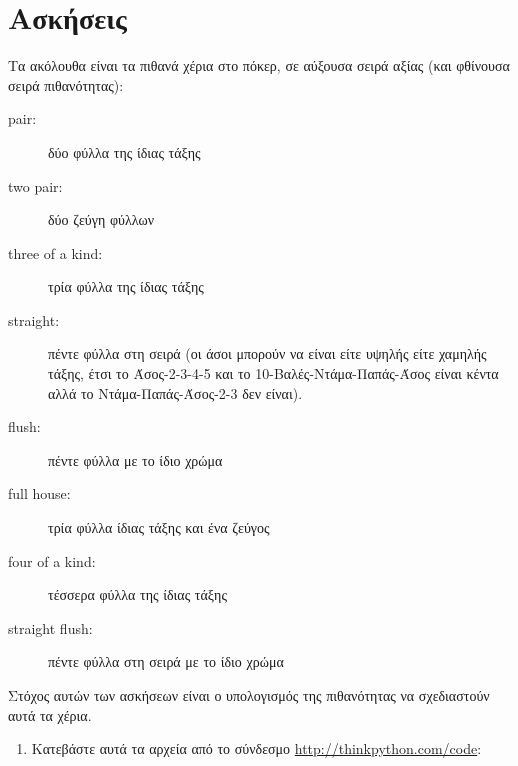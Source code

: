 \documentclass[10pt]{book}
\begin{document}
\section{Ασκήσεις}

\begin{exercise}
\label{poker}

Τα ακόλουθα είναι τα πιθανά χέρια στο πόκερ, σε αύξουσα σειρά αξίας (και φθίνουσα 
σειρά πιθανότητας):

\begin{description}

\item[pair:]  δύο φύλλα της ίδιας τάξης 
\vspace{-0.05in}

\item[two pair:]  δύο ζεύγη φύλλων 
\vspace{-0.05in}

\item[three of a kind:]  τρία φύλλα της ίδιας τάξης 
\vspace{-0.05in}

\item[straight:]  πέντε φύλλα στη σειρά (οι άσοι μπορούν να είναι είτε υψηλής είτε χαμηλής τάξης, έτσι το Άσος-2-3-4-5 και το 10-Βαλές-Ντάμα-Παπάς-Άσος είναι κέντα αλλά το Ντάμα-Παπάς-Άσος-2-3 δεν είναι). 
\vspace{-0.05in}

\item[flush:]  πέντε φύλλα με το ίδιο χρώμα 
\vspace{-0.05in}

\item[full house:]  τρία φύλλα ίδιας τάξης και ένα ζεύγος 
\vspace{-0.05in}

\item[four of a kind:]  τέσσερα φύλλα της ίδιας τάξης 
\vspace{-0.05in}

\item[straight flush:]  πέντε φύλλα στη σειρά με το ίδιο χρώμα 
\vspace{-0.05in}

\end{description}
%
Στόχος αυτών των ασκήσεων είναι ο υπολογισμός της πιθανότητας να σχεδιαστούν 
αυτά τα χέρια.

\begin{enumerate}

\item Κατεβάστε αυτά τα αρχεία από το σύνδεσμο \url{http://thinkpython.com/code}:


\end{enumerate}
\end{exercise}
\end{document}
